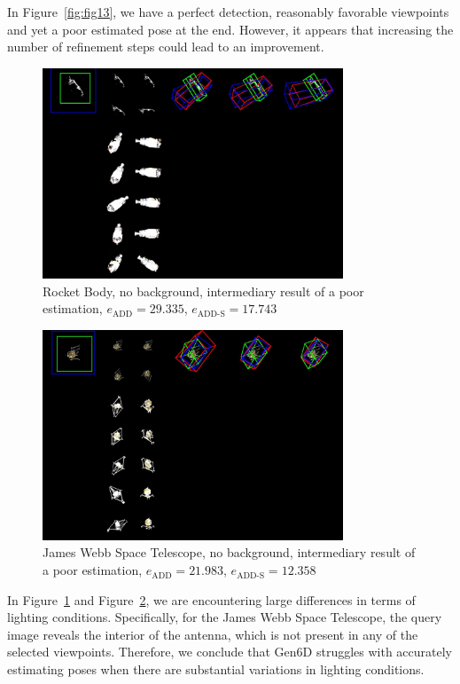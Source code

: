 In Figure~\ref{fig:fig13}, we have a perfect detection, reasonably favorable viewpoints and yet a poor estimated pose at the end. However, it appears that increasing the number of refinement steps could lead to an improvement.
\bigskip
\cleardoublepage{}

\begin{figure}[ht]
  \centering
  \includegraphics[width=0.8\textwidth]{data/fig14.jpg}
  \caption{Rocket Body, no background, intermediary result of a poor estimation, $e_\mathrm{ADD}=29.335$, $e_{\mathrm{ADD}\text{-}\mathrm{S}}=17.743$}
  \label{fig:fig14}
\end{figure}

\begin{figure}[ht]
  \centering
  \includegraphics[width=0.8\textwidth]{data/fig15.jpg}
  \caption{James Webb Space Telescope, no background, intermediary result of a poor estimation, $e_\mathrm{ADD}=21.983$, $e_{\mathrm{ADD}\text{-}\mathrm{S}}=12.358$}
  \label{fig:fig15}
\end{figure}

In Figure~\ref{fig:fig14} and Figure~\ref{fig:fig15}, we are encountering large differences in terms of lighting conditions. Specifically, for the James Webb Space Telescope, the query image reveals the interior of the antenna, which is not present in any of the selected viewpoints. Therefore, we conclude that Gen6D struggles with accurately estimating poses when there are substantial variations in lighting conditions.


